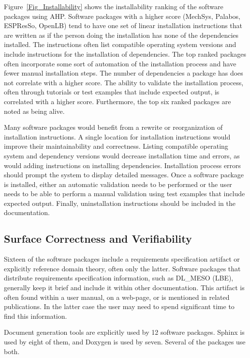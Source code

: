 \documentclass[final, 3p, times, authoryear]{elsarticle}
\begin{document}
Figure~\ref{Fig_Installability} shows the installability ranking of the software
packages using AHP. Software packages with a higher score (MechSys, Palabos,
ESPResSo, OpenLB) tend to have one set of linear installation instructions that
are written as if the person doing the installation has none of the dependencies
installed. The instructions often list compatible operating system versions and
include instructions for the installation of dependencies. The top ranked
packages often incorporate some sort of automation of the installation process
and have fewer manual installation steps. The number of dependencies a package
has does not correlate with a higher score. The ability to validate the
installation process, often through tutorials or test examples that include
expected output, is correlated with a higher score. Furthermore, the top six
ranked packages are noted as being alive. 

Many software packages would benefit from a rewrite or reorganization of
installation instructions. A single location for installation instructions would
improve their maintainability and correctness. Listing compatible operating
system and dependency versions would decrease installation time and errors, as
would adding instructions on installing dependencies. Installation process
errors should prompt the system to display detailed messages. Once a software
package is installed, either an automatic validation needs to be performed or
the user needs to be able to perform a manual validation using test examples
that include expected output. Finally, uninstallation instructions should be
included in the documentation. 
 
\subsection{Surface Correctness and Verifiability}

Sixteen of the software packages include a requirements specification artifact
or explicitly reference domain theory, often only the latter. Software packages
that distribute requirements specification information, such as DL\_MESO (LBE),
generally keep it brief and include it within other documentation. This artifact
is often found within a user manual, on a web-page, or is mentioned in related
publications. In the latter case the user may need to spend significant time to
find this information. 

Document generation tools are explicitly used by 12 software packages. Sphinx is
used by eight of them, and Doxygen is used by seven. Several of the packages use
both.
\end{document}
